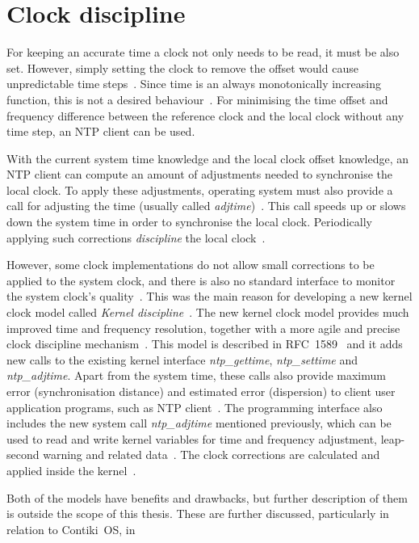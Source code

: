 \section{Clock discipline}\label{sec:system-discipline}
For keeping an accurate time a clock not only needs to be read, it must be also set.
However, simply setting the clock to remove the offset would cause unpredictable time steps~\cite{ntp-faq}.
Since time is an always monotonically increasing function, this is not a desired behaviour~\cite{ntp-daq}.
For minimising the time offset and frequency difference between
the reference clock and the local clock without any time step,
an NTP client can be used.

With the current system time knowledge and the local clock offset knowledge,
an NTP client can compute an amount of adjustments needed to synchronise the local clock.
To apply these adjustments, operating system must also provide a call
for adjusting the time (usually called {\it{adjtime}})~\cite{nanokernel}.
This call speeds up or slows down the system time in order to synchronise the local clock.
Periodically applying such corrections {\it{discipline}} the local clock~\cite{ntp-faq}.

However, some clock implementations do not allow small corrections to be applied
to the system clock, and there is also no standard interface to monitor the system clock's quality~\cite{ntp-faq}.
This was the main reason for developing a new kernel clock model called {\it{Kernel discipline}}~\cite{nanokernel}.
The new kernel clock model provides much improved time and frequency
resolution, together with a more agile and precise clock discipline mechanism~\cite{nanokernel}.
This model is described in RFC~1589~\cite{rfc1589} and it adds new calls to the existing kernel interface
{\it{ntp\_gettime}}, {\it{ntp\_settime}} and {\it{ntp\_adjtime}}.
Apart from the system time, these calls also provide maximum error (synchronisation distance)
and estimated error (dispersion) to client user application programs, such as NTP client~\cite{rfc1589}.
The programming interface also includes the new
system call {\it{ntp\_adjtime}} mentioned previously, which can be used
to read and write kernel variables for time and frequency
adjustment, leap-second warning and related data~\cite{rfc1589}.
The clock corrections are calculated and applied inside the kernel~\cite{ntp-faq}.

Both of the models have benefits and drawbacks,
but further description of them is outside the scope of this thesis.
These are further discussed, particularly in relation to Contiki~OS, in %
